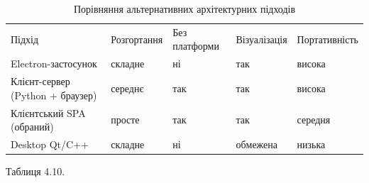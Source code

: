 \documentclass[
]{article}
\begin{document}
\begin{longtable}[]{@{}
  >{\raggedright\arraybackslash}p{}
  >{\raggedright\arraybackslash}p{}
  >{\raggedright\arraybackslash}p{}
  >{\raggedright\arraybackslash}p{}
  >{\raggedright\arraybackslash}p{}@{}}
\caption{Порівняння альтернативних архітектурних
підходів}\tabularnewline
\toprule\noalign{}
\endfirsthead
\endhead
\bottomrule\noalign{}
\endlastfoot
Підхід & Розгортання & Без платформи & Візуалізація & Портативність \\
Electron-застосунок & складне & ні & так & висока \\
Клієнт-сервер (Python + браузер) & середнє & так & так & висока \\
Клієнтський SPA (обраний) & просте & так & так & середня \\
Desktop Qt/C++ & складне & ні & обмежена & низька \\
\end{longtable}

Таблиця 4.10.
\end{document}
